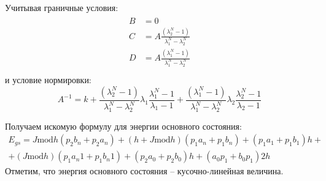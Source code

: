 Учитывая граничные условия:
\begin{align}
\begin{split}
B&=0 \\
C&=A \frac{\left(\lambda_2^N-1\right)}{\lambda_1^N-\lambda_2^N} \\
D&=A\frac{\left(\lambda_1^N-1\right)}{\lambda_1^N-\lambda_2^N} \\
\end{split}
\end{align}
и условие нормировки:
\begin{equation}
	A^{-1} = k+\frac{\left(\lambda_2^N-1\right)}{\lambda_1^N-\lambda_2^N}\lambda_1 \frac{\lambda_1^N-1}{\lambda_1-1}+\frac{\left(\lambda_1^N-1\right)}{\lambda_1^N-\lambda_2^N}\lambda_2 \frac{\lambda_2^N-1}{\lambda_2-1}
\end{equation}

Получаем искомую формулу для энергии основного состояния:
\begin{multline}
E_{gs} = J\text{mod} h (p_2 b_n+p_2 a_n) + (h +  J\text{mod} h) (p_1 a_n+p_1 b_n)+(p_1  a_1+p_1  b_1) h +\\+(J\text{mod} h) (p_1 a_n1+p_1 b_n1) + (p_2  a_0+p_2  b_0) h+( a_0 p_1+ b_0 p_1) 2 h
\end{multline}
Отметим, что энергия основного состояния -- кусочно-линейная величина.
 

